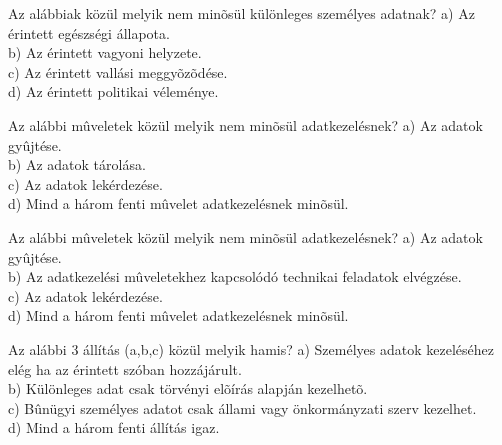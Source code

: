 \begin{frame}


\begin{tcolorbox}[title={176. Kérdés}]
Az alábbiak közül melyik nem minõsül különleges személyes adatnak?
\tcblower
a) Az érintett egészségi állapota.\\
b) Az érintett vagyoni helyzete.\\
c) Az érintett vallási meggyõzõdése.\\
d) Az érintett politikai véleménye.
\end{tcolorbox}

\begin{tcolorbox}[title={177. Kérdés}]
Az alábbi mûveletek közül melyik nem minõsül adatkezelésnek?
\tcblower
a) Az adatok gyûjtése.\\
b) Az adatok tárolása.\\
c) Az adatok lekérdezése.\\
d) Mind a három fenti mûvelet adatkezelésnek minõsül.
\end{tcolorbox}

\begin{tcolorbox}[title={177/A. Kérdés}]
Az alábbi mûveletek közül melyik nem minõsül adatkezelésnek?
\tcblower
a) Az adatok gyûjtése.\\
b) Az adatkezelési mûveletekhez kapcsolódó technikai feladatok elvégzése.\\
c) Az adatok lekérdezése.\\
d) Mind a három fenti mûvelet adatkezelésnek minõsül.
\end{tcolorbox}

\begin{tcolorbox}[title={178. Kérdés}]
Az alábbi 3 állítás (a,b,c) közül melyik hamis?
\tcblower
a) Személyes adatok kezeléséhez elég ha az érintett szóban hozzájárult.\\
b) Különleges adat csak törvényi elõírás alapján kezelhetõ.\\
c) Bûnügyi személyes adatot csak állami vagy önkormányzati szerv kezelhet.\\
d) Mind a három fenti állítás igaz.
\end{tcolorbox}

\end{frame}


